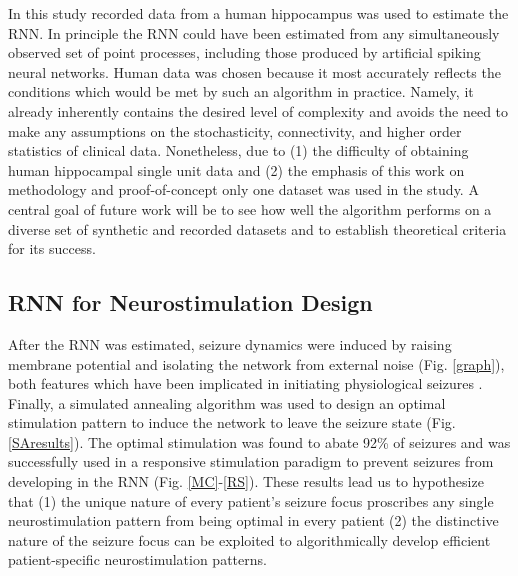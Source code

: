 \documentclass[journal,twoside,web]{ieeecolor}
\newcommand{\success}{92} %
\begin{document}
In this study recorded data from a human hippocampus was used to estimate the RNN. 
In principle the RNN could have been estimated from any simultaneously observed set of point processes, including those produced by artificial spiking neural networks. 
Human data was chosen because it most accurately reflects the conditions which would be met by such an algorithm in practice. 
Namely, it already inherently contains the desired level of complexity and avoids the need to make any assumptions on the stochasticity, connectivity, and higher order statistics of clinical data.
Nonetheless, due to (1) the difficulty of obtaining human hippocampal single unit data and (2) the emphasis of this work on methodology and proof-of-concept only one dataset was used in the study. 
A central goal of future work will be to see how well the algorithm performs on a diverse set of synthetic and recorded datasets and to establish theoretical criteria for its success. 

\subsection{RNN for Neurostimulation Design}

After the RNN was estimated, seizure dynamics were induced by raising membrane potential and isolating the network from external noise (Fig. \ref{graph}), both features which have been implicated in initiating physiological seizures \cite{fricker99,wendling03,warren10}.
Finally, a simulated annealing algorithm was used to design an optimal stimulation pattern to induce the network to leave the seizure state (Fig. \ref{SAresults}).
The optimal stimulation was found to abate \success{}\% of seizures and was  successfully used in a responsive stimulation paradigm to prevent seizures from developing in the RNN (Fig. \ref{MC}-\ref{RS}).
These results lead us to hypothesize that (1) the unique nature of every patient's seizure focus proscribes any single neurostimulation pattern from being optimal in every patient (2) the distinctive nature of the seizure focus can be exploited to algorithmically develop efficient patient-specific neurostimulation patterns.
\end{document}
